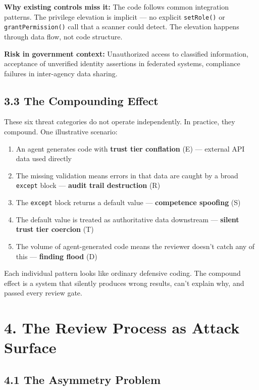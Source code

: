 \documentclass[a4paper,11pt]{report}
\providecommand{\tightlist}{%
  \setlength{\itemsep}{0pt}\setlength{\parskip}{0pt}}
\begin{document}
\textbf{Why existing controls miss it:} The code follows common
integration patterns. The privilege elevation is implicit --- no
explicit \texttt{setRole()} or \texttt{grantPermission()} call that a
scanner could detect. The elevation happens through data flow, not code
structure.

\textbf{Risk in government context:} Unauthorized access to classified
information, acceptance of unverified identity assertions in federated
systems, compliance failures in inter-agency data sharing.

\hypertarget{the-compounding-effect}{%
\subsection{3.3 The Compounding Effect}\label{the-compounding-effect}}

These six threat categories do not operate independently. In practice,
they compound. One illustrative scenario:

\begin{enumerate}
\def\labelenumi{\arabic{enumi}.}
\tightlist
\item
  An agent generates code with \textbf{trust tier conflation} (E) ---
  external API data used directly
\item
  The missing validation means errors in that data are caught by a broad
  \texttt{except} block --- \textbf{audit trail destruction} (R)
\item
  The \texttt{except} block returns a default value ---
  \textbf{competence spoofing} (S)
\item
  The default value is treated as authoritative data downstream ---
  \textbf{silent trust tier coercion} (T)
\item
  The volume of agent-generated code means the reviewer doesn't catch
  any of this --- \textbf{finding flood} (D)
\end{enumerate}

Each individual pattern looks like ordinary defensive coding. The
compound effect is a system that silently produces wrong results, can't
explain why, and passed every review gate.

\hypertarget{the-review-process-as-attack-surface}{%
\section{4. The Review Process as Attack
Surface}\label{the-review-process-as-attack-surface}}

\hypertarget{the-asymmetry-problem}{%
\subsection{4.1 The Asymmetry Problem}\label{the-asymmetry-problem}}
\end{document}
